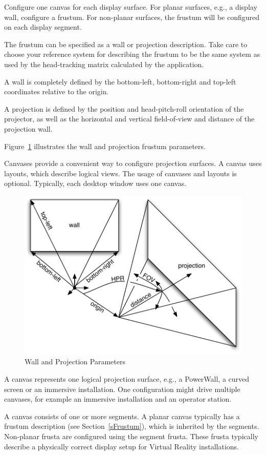 \documentclass[10pt,a4]{scrartcl}
\newcommand{\fig}[1]{Figure~\ref{#1}}
\newcommand{\sref}[1]{Section~\ref{#1}}
\begin{document}
Configure one \textsf{canvas} for each display surface. For planar
surfaces, e.g., a display wall, configure a frustum. For non-planar
surfaces, the frustum will be configured on each display segment.

The frustum can be specified as a wall or projection description. Take
care to choose your reference system for describing the frustum to be
the same system as used by the head-tracking matrix calculated by the
application.

A wall is completely defined by the bottom-left, bottom-right and
top-left coordinates relative to the origin.

A projection is defined by the position and head-pitch-roll orientation
of the projector, as well as the horizontal and vertical field-of-view
and distance of the projection wall.

\fig{fFrusta} illustrates the wall and projection frustum parameters.

Canvases provide a convenient way to configure projection surfaces. A
canvas uses layouts, which describe logical views. The usage of canvases
and layouts is optional. Typically, each desktop window uses one canvas.

\begin{figure}
  \includegraphics[width=.618\textwidth]{images/frusta.pdf}
  {\caption{\label{fFrusta}Wall and Projection Parameters}}
\end{figure}
A canvas represents one logical projection surface, e.g., a PowerWall, a
curved screen or an immersive installation. One configuration might
drive multiple canvases, for example an immersive installation and an
operator station.

A canvas consists of one or more segments. A planar canvas typically has
a frustum description (see \sref{sFrustum}), which is inherited by the
segments. Non-planar frusta are configured using the segment
frusta. These frusta typically describe a physically correct display
setup for Virtual Reality installations.
\end{document}
